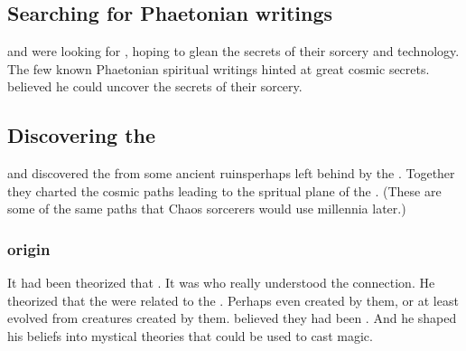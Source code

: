 \subsection{Searching for Phaetonian writings}
\Sethicus and \Tiamat were looking for , hoping to glean the secrets of their sorcery and technology. 
The few known Phaetonian spiritual writings hinted at great cosmic secrets.
\Sethicus believed he could uncover the secrets of their sorcery.










\subsection{Discovering the \xss}
\Sethicus and \Tiamat discovered the \xss{} from some ancient ruins\dash perhaps left behind by the \voyagers. 
Together they charted the cosmic paths leading to the spritual plane of the \xzaishann. 
(These are some of the same paths that Chaos sorcerers would use millennia later.)





\subsubsection{\Ophidian origin}
It had been theorized that . 
It was \Sethicus who really understood the connection. 
He theorized that the \ophidians were related to the \xss.
Perhaps even created by them, or at least evolved from creatures created by them.
\Sethicus believed they had been . 
And he shaped his beliefs into mystical theories that could be used to cast magic. 

